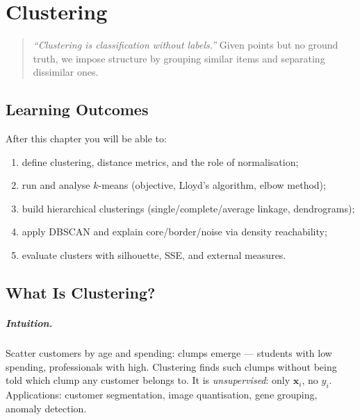 \chapter{Clustering}
\label{ch:clustering}

\begin{quote}
\emph{``Clustering is classification without labels.''} Given points but no ground truth, we impose structure by grouping similar items and separating dissimilar ones.
\end{quote}

\noindent{}
\vspace{0.4em}

\section*{Learning Outcomes}
After this chapter you will be able to:
\begin{enumerate}[label=(L\arabic*)]
    \item define clustering, distance metrics, and the role of normalisation;
    \item run and analyse $k$-means (objective, Lloyd's algorithm, elbow method);
    \item build hierarchical clusterings (single/complete/average linkage, dendrograms);
    \item apply DBSCAN and explain core/border/noise via density reachability;
    \item evaluate clusters with silhouette, SSE, and external measures.
\end{enumerate}

\section{What Is Clustering?}
\label{sec:what-clustering}
\paragraph{Intuition.} Scatter customers by age and spending: clumps emerge --- students with low spending, professionals with high. Clustering finds such clumps without being told which clump any customer belongs to. It is \emph{unsupervised}: only $\mathbf{x}_i$, no $y_i$. Applications: customer segmentation, image quantisation, gene grouping, anomaly detection.

